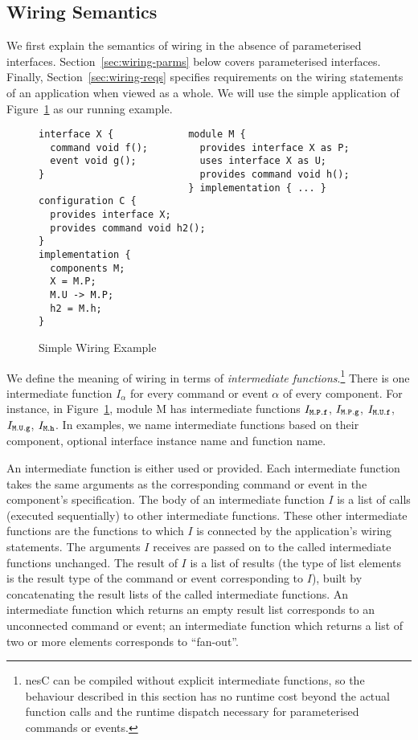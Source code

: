 \documentclass[11pt]{article}
\newcommand{\code}[1]{{\tt #1}}
\newcommand{\nesc}{nesC\xspace}
\begin{document}
\subsection{Wiring Semantics}
\label{sec:wiring-semantics}

We first explain the semantics of wiring in the absence of parameterised
interfaces. Section~\ref{sec:wiring-parms} below covers parameterised
interfaces. Finally, Section~\ref{sec:wiring-reqs} specifies requirements
on the wiring statements of an application when viewed as a whole. We will
use the simple application of Figure~\ref{fig:wiring} as our running
example.

\begin{figure}
\begin{verbatim}
interface X {             module M {
  command void f();         provides interface X as P;
  event void g();           uses interface X as U;
}                           provides command void h();
                          } implementation { ... }
configuration C {
  provides interface X;
  provides command void h2();
}
implementation {
  components M;
  X = M.P;
  M.U -> M.P;
  h2 = M.h;
}  
\end{verbatim}
\caption{Simple Wiring Example}
\label{fig:wiring}
\end{figure}

We define the meaning of wiring in terms of \emph{intermediate
functions}.\footnote{\nesc can be compiled without explicit intermediate
functions, so the behaviour described in this section has no runtime cost
beyond the actual function calls and the runtime dispatch necessary for
parameterised commands or events.}  There is one intermediate function
$I_\alpha$ for every command or event $\alpha$ of every component. For
instance, in Figure~\ref{fig:wiring}, module M has intermediate functions
$I_\code{M.P.f}$, $I_\code{M.P.g}$, $I_\code{M.U.f}$, $I_\code{M.U.g}$,
$I_\code{M.h}$.  In examples, we name intermediate functions based on their
component, optional interface instance name and function name.

An intermediate function is either used or provided. Each intermediate
function takes the same arguments as the corresponding command or event in
the component's specification. The body of an intermediate function $I$ is
a list of calls (executed sequentially) to other intermediate
functions. These other intermediate functions are the functions to which
$I$ is connected by the application's wiring statements. The arguments $I$
receives are passed on to the called intermediate functions unchanged. The
result of $I$ is a list of results (the type of list elements is the result
type of the command or event corresponding to $I$), built by concatenating
the result lists of the called intermediate functions. An intermediate
function which returns an empty result list corresponds to an unconnected
command or event; an intermediate function which returns a list of two or
more elements corresponds to ``fan-out''.
\end{document}

